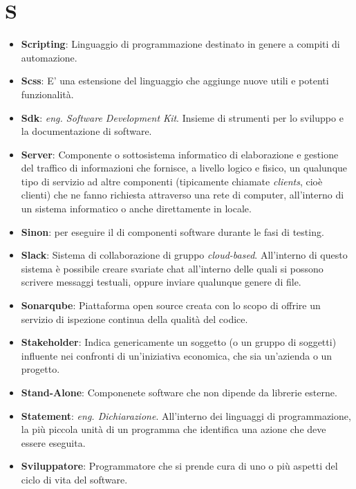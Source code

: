 \section{S}
\begin{itemize}
	\item
	\textbf{Scripting}: Linguaggio di programmazione destinato in genere a compiti di automazione.
	\item
	\textbf{Scss}: E' una estensione del linguaggio  che aggiunge nuove utili e potenti funzionalità.
	\item
	\textbf{Sdk}: \textit{eng. Software Development Kit}. Insieme di strumenti per lo sviluppo e la documentazione di software.
	\item
	\textbf{Server}: Componente o sottosistema informatico di elaborazione e gestione del traffico di informazioni che fornisce, a livello logico e fisico, un qualunque tipo di servizio ad altre componenti (tipicamente chiamate \textit{clients}, cioè clienti) che ne fanno richiesta attraverso una rete di computer, all'interno di un sistema informatico o anche direttamente in locale.
	\item
	\textbf{Sinon}:  per eseguire il  di componenti software durante le fasi di testing.
	\item
	\textbf{Slack}: Sistema di collaborazione di gruppo \textit{cloud-based}. All'interno di questo sistema è possibile creare svariate chat all'interno delle quali si possono scrivere messaggi testuali, oppure inviare qualunque genere di file.
	\item
	\textbf{Sonarqube}: Piattaforma open source creata con lo scopo di offrire un servizio di ispezione continua della qualità del codice.
	\item
	\textbf{Stakeholder}: Indica genericamente un soggetto (o un gruppo di soggetti) influente nei confronti di un'iniziativa economica, che sia un'azienda o un progetto.
	\item
	\textbf{Stand-Alone}: Componenete software che non dipende da librerie esterne.
	\item
	\textbf{Statement}: \textit{eng. Dichiarazione}. All'interno dei linguaggi di programmazione, la più piccola unità di un programma che identifica una azione che deve essere eseguita.
	\item
	\textbf{Sviluppatore}: Programmatore che si prende cura di uno o più aspetti del ciclo di vita del software.
\end{itemize}
\newpage